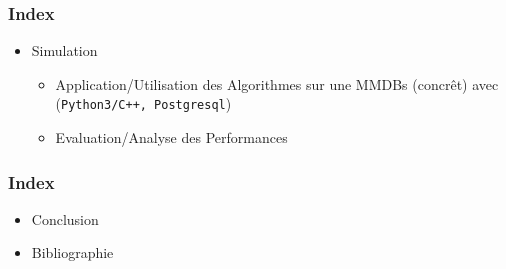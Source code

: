 \begin{frame}[plain]
		\begin{block}{}
		\frametitle{\caasifont Index}
			\begin{itemize}
				\item Simulation \vspace{1.5em}
				\begin{itemize}
					\item Application/Utilisation des Algorithmes sur une MMDBs (concrêt) avec ({\tt Python3/C++, Postgresql}) \vspace{1.5em}
					\item Evaluation/Analyse des Performances \vspace{1.5em}
				\end{itemize}			
			\end{itemize}
		\end{block}
\end{frame}


\begin{frame}[plain]
		\begin{block}{}
		\frametitle{\caasifont Index}
			\begin{itemize}
				\item Conclusion \vspace{1.5em}
				\item Bibliographie \vspace{1.5em}
			\end{itemize}
		\end{block}
\end{frame}





	
	
	


 



